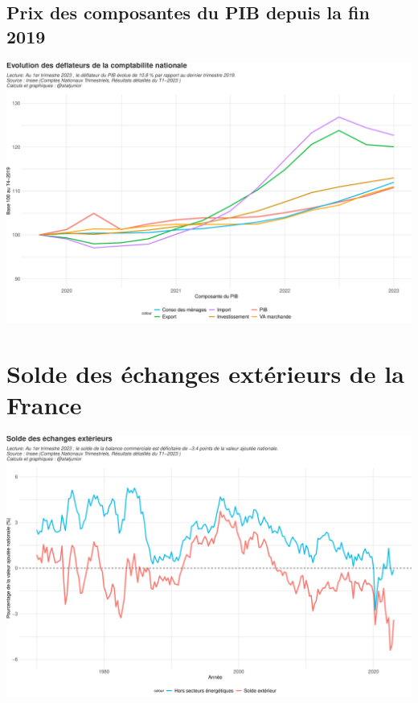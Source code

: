 \documentclass[
  paper=a4,
  ,captions=tableheading
]{scrartcl}
\begin{document}
\hypertarget{prix-des-composantes-du-pib-depuis-la-fin-2019}{%
\subsection{Prix des composantes du PIB depuis la fin
2019}\label{prix-des-composantes-du-pib-depuis-la-fin-2019}}

\includegraphics{rapport_pdf_compte_branche_files/figure-latex/unnamed-chunk-5-1.pdf}

\newpage

\hypertarget{solde-des-uxe9changes-extuxe9rieurs-de-la-france}{%
\section{Solde des échanges extérieurs de la
France}\label{solde-des-uxe9changes-extuxe9rieurs-de-la-france}}

\includegraphics{rapport_pdf_compte_branche_files/figure-latex/unnamed-chunk-6-1.pdf}
\end{document}
